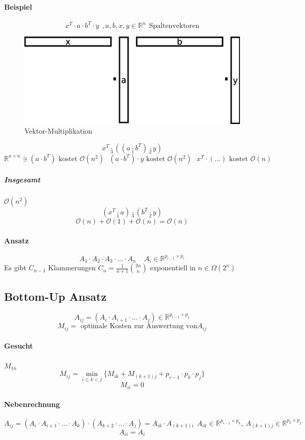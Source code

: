 \paragraph{Beispiel}
\[ x^T\cdot a \cdot b^T \cdot y~~,a,b,x,y\in \mathbb{R}^n~~\text{Spaltenvektoren} \]
\begin{figure}[H]
	\centering
	\includegraphics[width=0.4\linewidth]{29/Grafik/Diagramm2}
	\caption{Vektor-Multiplikation}
	\label{fig:Vektor-Multiplikation}
\end{figure}
\[ x^T\underset{3}{\cdot} ((a \underset{1}{\cdot} b^T) \underset{2}{\cdot} y) \]
\[ \mathbb{R}^{n\times n} \ni (a\cdot b^T) \text{ kostet }\mathcal{O}(n^2)~~~ (a\cdot b^T)\cdot y \text{ kostet } \mathcal{O} (n^2) ~~~ x^T\cdot (\ldots) \text{ kostet } \mathcal{O}(n) \]
\subparagraph{Insgesamt} $\mathcal{O}(n^2)$\\
\[ (x^T \underset{1}{\cdot} a ) \underset{3}{\cdot} (b^T \underset{2}{\cdot} y) \]
\[\mathcal{O}(n) + \mathcal{O}(1) + \mathcal{O}(n) = \mathcal{O}(n)  \]
\paragraph{Ansatz}
\[ A_1\cdot A_2\cdot A_3\cdot\ldots\cdot A_n~~~~~A_i\in\mathbb{R}^{p_{i-1}\times p_i} \]
Es gibt $C_{n-1}$ Klammerungen $C_n = \frac{1}{n+1}\binom{2n}{n}$ exponentiell in $n \in \Omega(2^n)$
\subsection{Bottom-Up Ansatz}
\[ A_{ij} = (A_i\cdot A_{i+1}\cdot\ldots\cdot A_j)\in \mathbb{R}^{p_{i-1}\times p_j} \]
\[M_{ij} = \text{ optimale Kosten zur Auswertung von} A_{ij} \]
\paragraph{Gesucht} $M_{1n}$
\[ M_{ij} = \underset{i\leq k < j}{\min} \{ M_{ik} + M_{(k+1)j} + p_{i-1}\cdot p_k\cdot p_j \}\] 
\[ M_{ii} = 0 \]
\paragraph{Nebenrechnung}
\[ A_{ij} = (A_i\cdot A_{i+1}\cdot\ldots\cdot A_k) \cdot (A_{k+2}\cdot\ldots\cdot A_j) = A_{ik} \cdot A_{(k+1)i} ~~A_{ik}\in\mathbb{R}^{p_{i-1}\times p_k},~A_{(k+1)j} \in \mathbb{R}^{p_k\times p_j} \]
\[ A_{ii} = A_i \]
